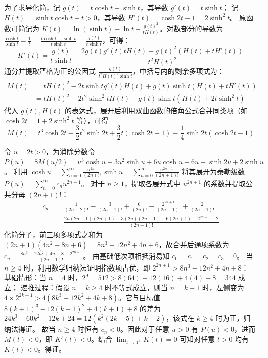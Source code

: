 \begin{solution}
为了求导化简，记 $g(t) = t \cosh t - \sinh t$，其导数 $g'(t) = t \sinh t$；
记 $H(t) = \sinh t \cosh t - t > 0$，其导数 $H'(t) = \cosh 2t - 1 = 2 \sinh^2 t$。
原函数可简记为 $K(t) = \ln(\sinh t) - \ln t - \frac{g(t)^2}{t H(t)}$。对数部分的导数为 $\frac{\cosh t}{\sinh t} - \frac{1}{t} = \frac{t\cosh t - \sinh t}{t\sinh t} = \frac{g(t)}{t \sinh t}$，可得：
\[ K'(t) = \frac{g(t)}{t \sinh t} - \frac{2g(t)g'(t)t H(t) - g(t)^2(H(t) + t H'(t))}{t^2 H(t)^2} \]
通分并提取严格为正的公因式 $\frac{g(t)}{t^2 H(t)^2 \sinh t}$，中括号内的剩余多项式为：
\begin{align*} M(t)& = t H(t)^2 - 2t \sinh t g'(t) H(t) + g(t) \sinh t (H(t) + t H'(t)) \\
  &  = t H(t)^2 - 2t^2 \sinh^2 t H(t) + g(t) \sinh t (H(t) + 2t \sinh^2 t) \end{align*}
代入 $g(t), H(t)$ 的表达式，展开后利用双曲函数的倍角公式合并同类项（如 $\cosh 2t = 1 + 2\sinh^2 t$ 等），可得
\[ M(t) = t^3 \cosh 2t - \frac{3}{2} t^2 \sinh 2t + \frac{3}{2} t (\cosh 2t - 1) - \frac{1}{4} \sinh 2t (\cosh 2t - 1) \]

令 $u = 2t > 0$，为消除分数令 $P(u) = 8M(u/2) = u^3 \cosh u - 3u^2 \sinh u + 6u \cosh u - 6u - \sinh 2u + 2 \sinh u$。
利用 $\displaystyle\cosh u = \sum_{n=0}^\infty \frac{u^{2n}}{(2n)!},\sinh u = \sum_{n=0}^\infty \frac{u^{2n+1}}{(2n+1)!}$ 将其展开为泰勒级数 $\displaystyle P(u) = \sum_{n=0}^\infty c_n u^{2n+1}$。
对于 $n \ge 1$，提取各展开式中 $u^{2n+1}$ 的系数并提取公共分母 $(2n+1)!$：
\begin{align*} c_n &= \frac{1}{(2n-2)!} - \frac{3}{(2n-1)!} + \frac{6}{(2n)!} - \frac{2^{2n+1}}{(2n+1)!} + \frac{2}{(2n+1)!} \\&= \frac{2n(2n-1)(2n+1) - 3(2n)(2n+1) + 6(2n+1) - 2^{2n+1} + 2}{(2n+1)!} \end{align*}
化简分子，前三项多项式之和为 $(2n+1)(4n^2 - 8n + 6) = 8n^3 - 12n^2 + 4n + 6$，故合并后通项系数为 $c_n = \frac{8n^3 - 12n^2 + 4n + 8 - 2^{2n+1}}{(2n+1)!}$。
由基础低次项相抵消易知 $c_0=c_1=c_2=c_3=0$。
当 $n \ge 4$ 时，利用数学归纳法证明指数项占优，即 $2^{2n+1} > 8n^3 - 12n^2 + 4n + 8$：
基础情形：当 $n=4$ 时，$2^9 = 512 > 8(64) - 12(16) + 4(4) + 8 = 344$ 成立；
递推过程：假设 $n=k \ge 4$ 时不等式成立，则当 $n=k+1$ 时，左侧变为 $4 \times 2^{2k+1} > 4(8k^3 - 12k^2 + 4k + 8)$。它与目标值 $8(k+1)^3 - 12(k+1)^2 + 4(k+1) + 8$ 的差为 $24k^3 - 60k^2 + 12k + 24 = 12(k^2(2k - 5) + k + 2)$，该式在 $k \ge 4$ 时为正，归纳法得证。
故当 $n \ge 4$ 时恒有 $c_n < 0$。因此对于任意 $u>0$ 有 $P(u) < 0$，进而 $M(t) < 0$，即 $K'(t) < 0$。结合 $\lim_{t \to 0^+} K(t) = 0$ 可知对任意 $t > 0$ 均有 $K(t) < 0$。得证。


\end{solution}
